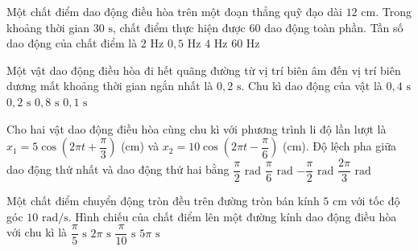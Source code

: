 \begin{ex}
Một chất điểm dao động điều hòa trên một đoạn thẳng quỹ đạo dài $12\text{ cm}$. Trong khoảng thời gian $30\text{ s}$, chất điểm thực hiện được $60$ dao động toàn phần. Tần số dao động của chất điểm là
\choice
{\True $2\text{ Hz}$}
{$0,5\text{ Hz}$}
{$4\text{ Hz}$}
{$60\text{ Hz}$}
\end{ex}

\begin{ex}
Một vật dao động điều hòa đi hết quãng đường từ vị trí biên âm đến vị trí biên dương mất khoảng thời gian ngắn nhất là $0,2\text{ s}$. Chu kì dao động của vật là
\choice
{\True $0,4\text{ s}$}
{$0,2\text{ s}$}
{$0,8\text{ s}$}
{$0,1\text{ s}$}
\end{ex}

\begin{ex}
Cho hai vật dao động điều hòa cùng chu kì với phương trình li độ lần lượt là $x_1 = 5\cos(2\pi t + \dfrac{\pi}{3})$ (cm) và $x_2 = 10\cos(2\pi t - \dfrac{\pi}{6})$ (cm). Độ lệch pha giữa dao động thứ nhất và dao động thứ hai bằng
\choice
{\True $\dfrac{\pi}{2}\text{ rad}$}
{$\dfrac{\pi}{6}\text{ rad}$}
{$-\dfrac{\pi}{2}\text{ rad}$}
{$\dfrac{2\pi}{3}\text{ rad}$}
\end{ex}

\begin{ex}
Một chất điểm chuyển động tròn đều trên đường tròn bán kính $5\text{ cm}$ với tốc độ góc $10\text{ rad/s}$. Hình chiếu của chất điểm lên một đường kính dao động điều hòa với chu kì là
\choice
{\True $\dfrac{\pi}{5}\text{ s}$}
{$2\pi\text{ s}$}
{$\dfrac{\pi}{10}\text{ s}$}
{$5\pi\text{ s}$}
\end{ex}

